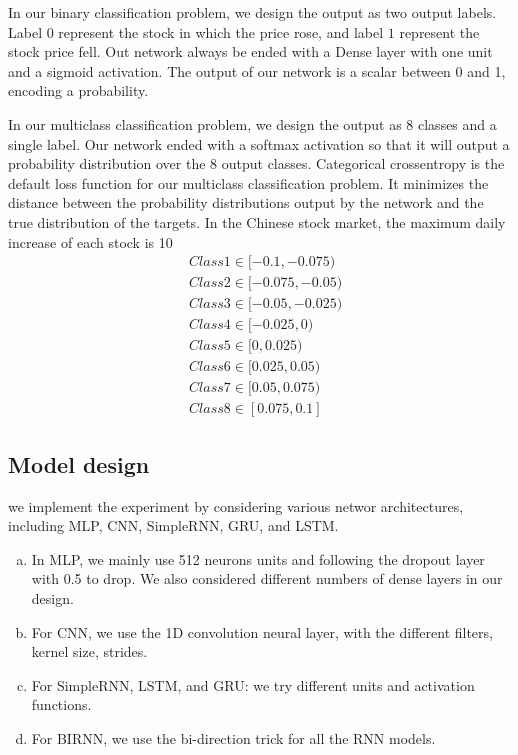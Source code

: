 \documentclass{article}
\begin{document}
In our binary classification problem, we design the output as two output labels. Label $0$ represent the stock in which the price rose, and label $1$ represent the stock price fell. Out network always be ended with a Dense layer with one unit and a sigmoid activation. The output of our network is a scalar between 0 and 1, encoding a probability.

In our multiclass classification problem, we design the output as 8 classes and a single label. Our network ended with a softmax activation so that it will output a probability distribution over the 8 output classes. Categorical crossentropy is the default loss function for our multiclass classification problem. It minimizes the distance between the probability distributions output by the network and the true distribution of the targets. In the Chinese stock market, the maximum daily increase of each stock is 10%
\begin{align}
	&Class1 \in [-0.1,-0.075) \\ &Class2 \in [-0.075,-0.05) \\&Class3 \in [-0.05,-0.025)\\&Class4 \in [-0.025,0)\\&Class5 \in [0,0.025)\\&Class6 \in [0.025,0.05)\\&Class7 \in [0.05,0.075)\\&Class8 \in [0.075,0.1] 
\end{align}
\subsection{Model design}
we implement the experiment by considering various networ architectures, including MLP, CNN, SimpleRNN, GRU, and LSTM.
\begin{enumerate}[(a)]
	\item In MLP, we mainly use 512 neurons units and following the dropout layer with 0.5 to drop. We also considered different numbers of dense layers in our design.
	\item For CNN, we use the 1D convolution neural layer, with the different filters, kernel size, strides.
	\item For SimpleRNN, LSTM, and GRU: we try different units and activation functions.
	\item For BIRNN, we use the bi-direction trick for all the RNN models.
\end{enumerate}
\end{document}
